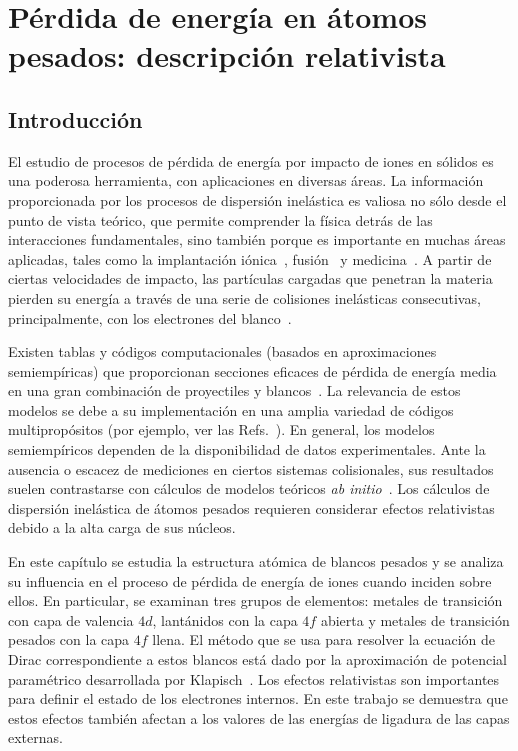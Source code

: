 \chapter{Pérdida de energía en átomos pesados: descripción relativista}
\label{chap:heavy}

\section{Introducción}
\label{sec:intro}

El estudio de procesos de pérdida de energía por impacto de iones 
en sólidos es una poderosa herramienta, con aplicaciones en diversas 
áreas. La información proporcionada por los procesos de dispersión 
inelástica es valiosa no sólo desde el punto de vista teórico, que 
permite comprender la física detrás de las interacciones fundamentales, 
sino también porque es importante en muchas áreas aplicadas, tales como 
la implantación iónica~\cite{Creutzburg:19,Jeynes:16}, 
fusión~\cite{Mayer:20,He:17} y medicina~\cite{Schardt:10,
AlcocerAvila:19,Vera:19}. A partir de ciertas velocidades de impacto, 
las partículas cargadas que penetran la materia pierden su energía a 
través de una serie de colisiones inelásticas consecutivas, 
principalmente, con los electrones del blanco~\cite{Chu:01,Sigmund:06}. 

Existen tablas y códigos computacionales (basados en aproximaciones 
semiempíricas) que proporcionan secciones eficaces de pérdida de energía 
media en una gran combinación de proyectiles y blancos~\cite{iaea_codes,
Paul:03}. La relevancia de estos modelos se debe a su implementación
en una amplia variedad de códigos multipropósitos (por ejemplo, ver las
Refs.~\cite{geant4,talys1.95,geopixe}). En general, los modelos 
semiempíricos dependen de la disponibilidad de datos experimentales. 
Ante la ausencia o escacez de mediciones en ciertos sistemas 
colisionales, sus resultados suelen contrastarse con cálculos de modelos 
teóricos \textit{ab initio}~\cite{Diwan:15,Damache:04,Damache:02}. Los 
cálculos de dispersión inelástica de átomos pesados requieren considerar 
efectos relativistas~\cite{Montanari:09} debido a la alta carga de sus 
núcleos. 

En este capítulo se estudia la estructura atómica de blancos pesados 
y se analiza su influencia en el proceso de pérdida de energía de iones 
cuando inciden sobre ellos. En particular, se examinan tres grupos de 
elementos: metales de transición con capa de valencia $4d$, lantánidos 
con la capa $4f$ abierta y metales de transición pesados con la capa 
$4f$ llena. El método que se usa para resolver la ecuación de Dirac 
correspondiente a estos blancos está dado por la aproximación de 
potencial paramétrico desarrollada por Klapisch~\cite{Klapisch:77,
Klapisch:67,Klapisch:71,BarShalom:01}. Los efectos relativistas son 
importantes para definir el estado de los electrones internos. En este 
trabajo se demuestra que estos efectos también afectan a los valores de 
las energías de ligadura de las capas externas.

